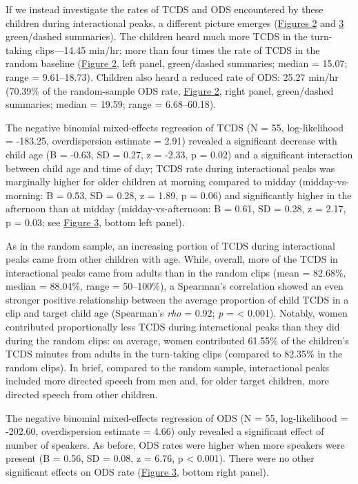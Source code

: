 \documentclass[,man,floatsintext]{apa6}
\begin{document}
If we instead investigate the rates of TCDS and ODS encountered by these
children during interactional peaks, a different picture emerges
(\protect\hyperlink{fig2}{Figures 2} and \protect\hyperlink{fig3}{3}
green/dashed summaries). The children heard much more TCDS in the
turn-taking clips---14.45 min/hr; more than four times the rate of TCDS
in the random baseline (\protect\hyperlink{fig2}{Figure 2}, left panel,
green/dashed summaries; median = 15.07; range = 9.61--18.73). Children
also heard a reduced rate of ODS: 25.27 min/hr (70.39\% of the
random-sample ODS rate, \protect\hyperlink{fig2}{Figure 2}, right panel,
green/dashed summaries; median = 19.59; range = 6.68--60.18).

The negative binomial mixed-effects regression of TCDS (N = 55,
log-likelihood = -183.25, overdispersion estimate = 2.91) revealed a
significant decrease with child age (B = -0.63, SD = 0.27, z = -2.33, p
= 0.02) and a significant interaction between child age and time of day;
TCDS rate during interactional peaks was marginally higher for older
children at morning compared to midday (midday-vs-morning: B = 0.53, SD
= 0.28, z = 1.89, p = 0.06) and significantly higher in the afternoon
than at midday (midday-vs-afternoon: B = 0.61, SD = 0.28, z = 2.17, p =
0.03; see \protect\hyperlink{fig3}{Figure 3}, bottom left panel).

As in the random sample, an increasing portion of TCDS during
interactional peaks came from other children with age. While, overall,
more of the TCDS in interactional peaks came from adults than in the
random clips (mean = 82.68\%, median = 88.04\%, range = 50--100\%), a
Spearman's correlation showed an even stronger positive relationship
between the average proportion of child TCDS in a clip and target child
age (Spearman's \emph{rho} = 0.92; \emph{p} = \textless{} 0.001).
Notably, women contributed proportionally less TCDS during interactional
peaks than they did during the random clips: on average, women
contributed 61.55\% of the children's TCDS minutes from adults in the
turn-taking clips (compared to 82.35\% in the random clips). In brief,
compared to the random sample, interactional peaks included more
directed speech from men and, for older target children, more directed
speech from other children.

The negative binomial mixed-effects regression of ODS (N = 55,
log-likelihood = -202.60, overdispersion estimate = 4.66) only revealed
a significant effect of number of speakers. As before, ODS rates were
higher when more speakers were present (B = 0.56, SD = 0.08, z = 6.76, p
\textless{} 0.001). There were no other significant effects on ODS rate
(\protect\hyperlink{fig3}{Figure 3}, bottom right panel).
\end{document}
